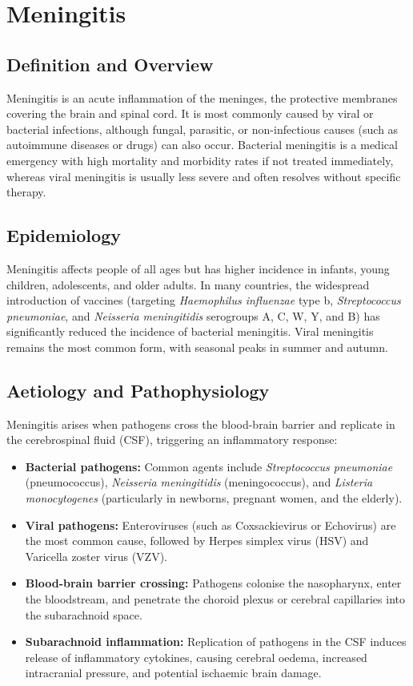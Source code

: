 \chapter{Meningitis}

\section*{Definition and Overview}
Meningitis is an acute inflammation of the meninges, the protective membranes covering the brain and spinal cord. It is most commonly caused by viral or bacterial infections, although fungal, parasitic, or non-infectious causes (such as autoimmune diseases or drugs) can also occur. Bacterial meningitis is a medical emergency with high mortality and morbidity rates if not treated immediately, whereas viral meningitis is usually less severe and often resolves without specific therapy.

\section*{Epidemiology}
Meningitis affects people of all ages but has higher incidence in infants, young children, adolescents, and older adults. In many countries, the widespread introduction of vaccines (targeting \textit{Haemophilus influenzae} type b, \textit{Streptococcus pneumoniae}, and \textit{Neisseria meningitidis} serogroups A, C, W, Y, and B) has significantly reduced the incidence of bacterial meningitis. Viral meningitis remains the most common form, with seasonal peaks in summer and autumn.

\section*{Aetiology and Pathophysiology}
Meningitis arises when pathogens cross the blood-brain barrier and replicate in the cerebrospinal fluid (CSF), triggering an inflammatory response:

\begin{itemize}
    \item \textbf{Bacterial pathogens:} Common agents include \textit{Streptococcus pneumoniae} (pneumococcus), \textit{Neisseria meningitidis} (meningococcus), and \textit{Listeria monocytogenes} (particularly in newborns, pregnant women, and the elderly).
    \item \textbf{Viral pathogens:} Enteroviruses (such as Coxsackievirus or Echovirus) are the most common cause, followed by Herpes simplex virus (HSV) and Varicella zoster virus (VZV).
    \item \textbf{Blood-brain barrier crossing:} Pathogens colonise the nasopharynx, enter the bloodstream, and penetrate the choroid plexus or cerebral capillaries into the subarachnoid space.
    \item \textbf{Subarachnoid inflammation:} Replication of pathogens in the CSF induces release of inflammatory cytokines, causing cerebral oedema, increased intracranial pressure, and potential ischaemic brain damage.
\end{itemize}

